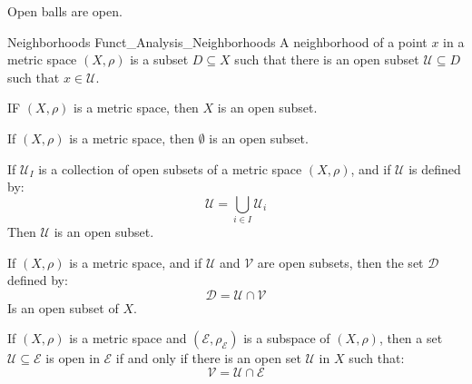             \begin{theorem}
                Open balls are open.
            \end{theorem}
            \begin{ldefinition}{Neighborhoods}
                  {Funct_Analysis_Neighborhoods}
                A neighborhood of a point $x$ in a metric space
                $(X,\rho)$ is a subset $D\subseteq{X}$ such
                that there is an open subset
                $\mathcal{U}\subseteq{D}$ such that
                $x\in\mathcal{U}$.
            \end{ldefinition}
            \begin{theorem}
                IF $(X,\rho)$ is a metric space, then $X$ is
                an open subset.
            \end{theorem}
            \begin{theorem}
                If $(X,\rho)$ is a metric space, then
                $\emptyset$ is an open subset.
            \end{theorem}
            \begin{theorem}
                If $\mathcal{U}_{I}$ is a collection of open subsets
                of a metric space $(X,\rho)$, and if
                $\mathcal{U}$ is defined by:
                \begin{equation}
                    \mathcal{U}=\bigcup_{i\in{I}}\mathcal{U}_{i}
                \end{equation}
                Then $\mathcal{U}$ is an open subset.
            \end{theorem}
            \begin{theorem}
                If $(X,\rho)$ is a metric space, and if
                $\mathcal{U}$ and $\mathcal{V}$ are open
                subsets, then the set $\mathcal{D}$ defined by:
                \begin{equation}
                    \mathcal{D}=\mathcal{U}\cap\mathcal{V}
                \end{equation}
                Is an open subset of $X$.
            \end{theorem}
            \begin{theorem}
                If $(X,\rho)$ is a metric space and
                $(\mathcal{E},\rho_{\mathcal{E}})$ is a subspace
                of $(X,\rho)$, then a set
                $\mathcal{U}\subseteq\mathcal{E}$
                is open in $\mathcal{E}$ if and only if there is
                an open set $\mathcal{U}$ in $X$ such that:
                \begin{equation}
                    \mathcal{V}=\mathcal{U}\cap\mathcal{E}
                \end{equation}
            \end{theorem}
